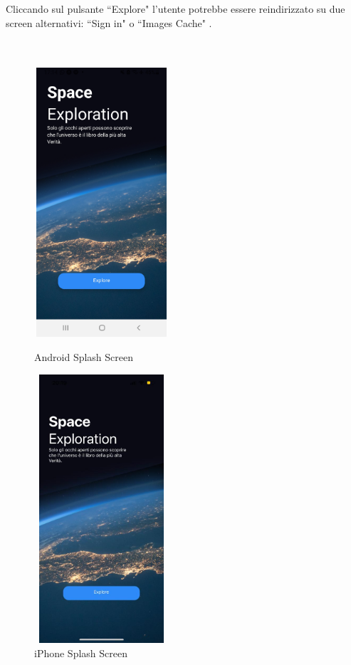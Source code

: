 Cliccando sul pulsante ``Explore" l'utente potrebbe essere reindirizzato su due screen alternativi: ``Sign in" o ``Images Cache" .\\ \\ \\
\begin{figure}[h]
    \begin{minipage}[h]{0.47\textwidth}
        \centering
        \includegraphics[width=5cm, height=10cm]{images/immaginiAndroid/splashScreen.jpg}
        \caption{\label{SpalshScreenAndroid} Android Splash Screen}
    \end{minipage}
    \hfill
    \begin{minipage}[h]{0.47\textwidth}
        \centering
        \includegraphics[width=5cm, height=10cm]{images/immaginiPhone/splashScreen.jpeg}
        \caption{\label{splashScreenIphone}iPhone Splash Screen}
    \end{minipage}
\end{figure}


